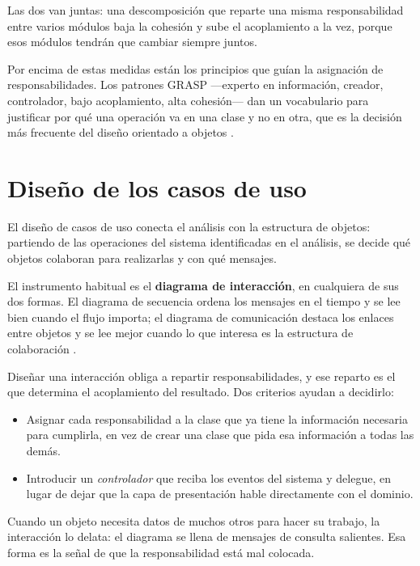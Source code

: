 Las dos van juntas: una descomposición que reparte una misma responsabilidad entre
varios módulos baja la cohesión y sube el acoplamiento a la vez, porque esos
módulos tendrán que cambiar siempre juntos.

Por encima de estas medidas están los principios que guían la asignación de
responsabilidades. Los patrones GRASP —experto en información, creador,
controlador, bajo acoplamiento, alta cohesión— dan un vocabulario para justificar
por qué una operación va en una clase y no en otra, que es la decisión más
frecuente del diseño orientado a objetos \cite{larman2006}.

\section{Diseño de los casos de uso}

El diseño de casos de uso conecta el análisis con la estructura de objetos:
partiendo de las operaciones del sistema identificadas en el análisis, se decide
qué objetos colaboran para realizarlas y con qué mensajes.

El instrumento habitual es el \textbf{diagrama de interacción}, en cualquiera de
sus dos formas. El diagrama de secuencia ordena los mensajes en el tiempo y se lee
bien cuando el flujo importa; el diagrama de comunicación destaca los enlaces
entre objetos y se lee mejor cuando lo que interesa es la estructura de
colaboración \cite{arlow2006}.

Diseñar una interacción obliga a repartir responsabilidades, y ese reparto es el
que determina el acoplamiento del resultado. Dos criterios ayudan a decidirlo:

\begin{itemize}
    \item Asignar cada responsabilidad a la clase que ya tiene la información
          necesaria para cumplirla, en vez de crear una clase que pida esa
          información a todas las demás.
    \item Introducir un \emph{controlador} que reciba los eventos del sistema y
          delegue, en lugar de dejar que la capa de presentación hable
          directamente con el dominio.
\end{itemize}

Cuando un objeto necesita datos de muchos otros para hacer su trabajo, la
interacción lo delata: el diagrama se llena de mensajes de consulta salientes.
Esa forma es la señal de que la responsabilidad está mal colocada.

